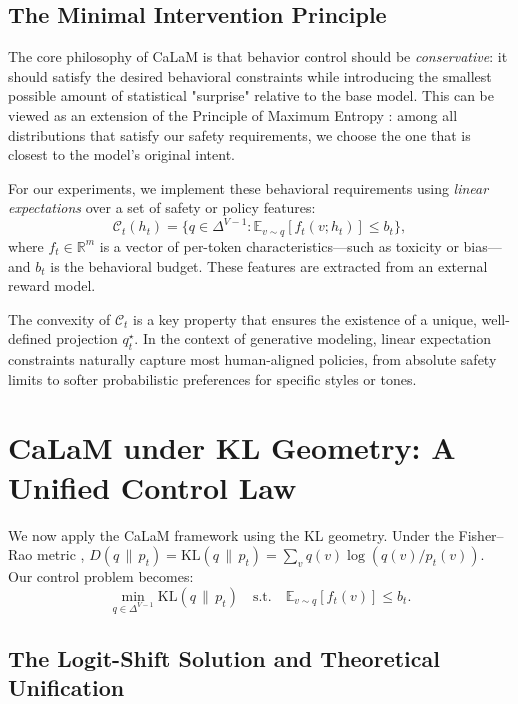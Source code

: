 \documentclass{article}
\theoremstyle{plain}
\theoremstyle{definition}
\theoremstyle{remark}
\begin{document}
\subsection{The Minimal Intervention Principle}

The core philosophy of CaLaM is that behavior control should be \emph{conservative}: it should satisfy the desired behavioral constraints while introducing the smallest possible amount of statistical "surprise" relative to the base model. This can be viewed as an extension of the Principle of Maximum Entropy \citep{jaynes1957information}: among all distributions that satisfy our safety requirements, we choose the one that is closest to the model's original intent.

For our experiments, we implement these behavioral requirements using \emph{linear expectations} over a set of safety or policy features:
\begin{equation}
  \mathcal{C}_t(h_t)
  =
  \Big\{ q \in \Delta^{V-1} :
    \mathbb{E}_{v \sim q}[f_t(v; h_t)] \le b_t
  \Big\},
  \label{eq:constraint}
\end{equation}
where $f_t \in \mathbb{R}^m$ is a vector of per-token characteristics---such as toxicity or bias---and $b_t$ is the behavioral budget. These features are extracted from an external reward model.

The convexity of $\mathcal{C}_t$ is a key property that ensures the existence of a unique, well-defined projection $q_t^\star$. In the context of generative modeling, linear expectation constraints naturally capture most human-aligned policies, from absolute safety limits to softer probabilistic preferences for specific styles or tones.


\section{CaLaM under KL Geometry: A Unified Control Law}
\label{sec:kl}

We now apply the CaLaM framework using the KL geometry. Under the Fisher--Rao metric \citep{amari2016information}, $D(q \,\|\, p_t) = \mathrm{KL}(q \,\|\, p_t) = \sum_v q(v) \log (q(v)/p_t(v))$. Our control problem becomes:
\begin{equation}
  \min_{q \in \Delta^{V-1}} \mathrm{KL}(q \,\|\, p_t)
  \quad \text{s.t.} \quad
  \mathbb{E}_{v \sim q}[f_t(v)] \le b_t.
  \label{eq:kl-problem}
\end{equation}

\subsection{The Logit-Shift Solution and Theoretical Unification}
\label{sec:kl-solution}
\end{document}

